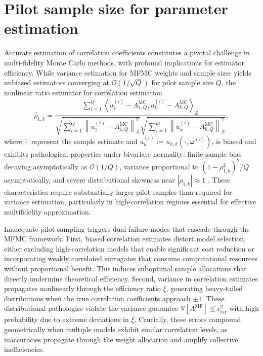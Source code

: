 \section{Pilot sample size for parameter estimation}\label{sec:Parameter_Estimation}
Accurate estimation of correlation coefficients constitutes a pivotal challenge in multi-fidelity Monte Carlo methods, with profound implications for estimator efficiency. While variance estimation for MFMC weights and sample sizes yields unbiased estimators converging at $\mathcal{O}(1/\sqrt{Q})$ for pilot sample size $Q$,  the nonlinear ratio estimator for correlation estimation
\[
\widehat{\rho}_{1,k} = \frac{\sum_{i=1}^Q\left\langle u_{1}^{(i)} - A_{1,Q}^{\text{MC}}, u_{k}^{(i)} - A_{k,Q}^{\text{MC}} \right\rangle_Z}{\sqrt{\sum_{i=1}^Q \left\|u_{1}^{(i)} - A_{1,Q}^{\text{MC}}\right\|_Z^2} \sqrt{\sum_{i=1}^Q \left\|u_{k}^{(i)} - A_{k,Q}^{\text{MC}}\right\|_Z^2}},
\]
where  $\widehat \cdot$ represent the sample estimate and $u_k^{(i)} := u_{h,k}(\cdot, \boldsymbol{\omega}^{(i)})$, is biased and exhibits pathological properties under bivariate normality: finite-sample bias decaying asymptotically as $\mathcal{O}(1/Q)$, variance proportional to $(1-\rho_{1,k}^2)^2/Q$ asymptotically, and severe distributional skewness near $|\rho_{1,k}| \approx 1$ \cite{Fi:1915,Ha:2007,Ri:1932}. These characteristics require substantially larger pilot samples than required for variance estimation, particularly in high-correlation regimes essential for effective multifidelity approximation.


Inadequate pilot sampling triggers dual failure modes that cascade through the MFMC framework. First, biased correlation estimates distort model selection, either excluding high-correlation models that enable significant cost reduction or incorporating weakly correlated surrogates that consume computational resources without proportional benefit. This induces suboptimal sample allocations that directly undermine theoretical efficiency. Second, variance in correlation estimates propagates nonlinearly through the efficiency ratio $\xi$, generating heavy-tailed distributions when the true correlation coefficients approach $\pm 1$. These distributional pathologies violate the variance guarantee $\mathbb{V}[A^{\mathrm{MF}}] \leq \epsilon_{\mathrm{tar}}^2$ with high probability due to extreme deviations in $\xi$. Crucially, these errors compound geometrically when multiple models exhibit similar correlation levels, as inaccuracies propagate through the weight allocation and amplify collective inefficiencies.


